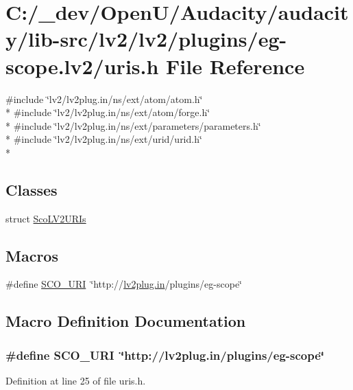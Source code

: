\hypertarget{eg-scope_8lv2_2uris_8h}{}\section{C\+:/\+\_\+dev/\+Open\+U/\+Audacity/audacity/lib-\/src/lv2/lv2/plugins/eg-\/scope.lv2/uris.h File Reference}
\label{eg-scope_8lv2_2uris_8h}
{\ttfamily \#include \char`\"{}lv2/lv2plug.\+in/ns/ext/atom/atom.\+h\char`\"{}}\\*
{\ttfamily \#include \char`\"{}lv2/lv2plug.\+in/ns/ext/atom/forge.\+h\char`\"{}}\\*
{\ttfamily \#include \char`\"{}lv2/lv2plug.\+in/ns/ext/parameters/parameters.\+h\char`\"{}}\\*
{\ttfamily \#include \char`\"{}lv2/lv2plug.\+in/ns/ext/urid/urid.\+h\char`\"{}}\\*
\subsection*{Classes}
\begin{DoxyCompactItemize}
\item 
struct \hyperlink{struct_sco_l_v2_u_r_is}{Sco\+L\+V2\+U\+R\+Is}
\end{DoxyCompactItemize}
\subsection*{Macros}
\begin{DoxyCompactItemize}
\item 
\#define \hyperlink{eg-scope_8lv2_2uris_8h_a899b63b554523cad91b32694a11ad4d7}{S\+C\+O\+\_\+\+U\+RI}~\char`\"{}http\+://\hyperlink{latency_8c_a7d946209d777cb95fe30364b8d321207}{lv2plug.\+in}/plugins/eg-\/scope\char`\"{}
\end{DoxyCompactItemize}


\subsection{Macro Definition Documentation}
\subsubsection[{\texorpdfstring{S\+C\+O\+\_\+\+U\+RI}{SCO_URI}}]{\setlength{\rightskip}{0pt plus 5cm}\#define S\+C\+O\+\_\+\+U\+RI~\char`\"{}http\+://{\bf lv2plug.\+in}/plugins/eg-\/scope\char`\"{}}\hypertarget{eg-scope_8lv2_2uris_8h_a899b63b554523cad91b32694a11ad4d7}{}\label{eg-scope_8lv2_2uris_8h_a899b63b554523cad91b32694a11ad4d7}


Definition at line 25 of file uris.\+h.

